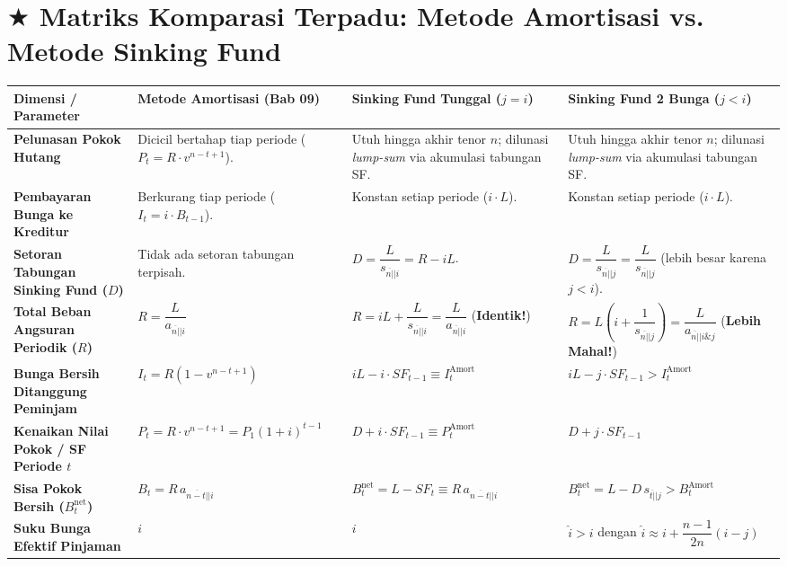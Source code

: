 \documentclass[10pt,a4paper]{article}
\newcommand{\angl}[1]{\overline{#1|}}
\begin{document}
\section*{\large $\bigstar$ Matriks Komparasi Terpadu: Metode Amortisasi vs. Metode Sinking Fund}

\begin{tcolorbox}[
    enhanced,
    colback=white,
    colframe=primaryblue,
    boxrule=0.8pt,
    arc=2mm,
    top=1.5mm, bottom=1.5mm, left=1.5mm, right=1.5mm
]
\footnotesize
\centering
\setlength{\tabcolsep}{2.5pt}
\begin{tabular}{p{2.6cm} p{4.5cm} p{4.7cm} p{4.7cm}}
\toprule
\textbf{Dimensi / Parameter} & \textbf{Metode Amortisasi (Bab 09)} & \textbf{Sinking Fund Tunggal ($j = i$)} & \textbf{Sinking Fund 2 Bunga ($j < i$)} \\
\midrule
\textbf{Pelunasan Pokok Hutang} & Dicicil bertahap tiap periode ($P_t = R \cdot v^{n-t+1}$). & Utuh hingga akhir tenor $n$; dilunasi \textit{lump-sum} via akumulasi tabungan SF. & Utuh hingga akhir tenor $n$; dilunasi \textit{lump-sum} via akumulasi tabungan SF. \\
\addlinespace
\textbf{Pembayaran Bunga ke Kreditur} & Berkurang tiap periode ($I_t = i \cdot B_{t-1}$). & Konstan setiap periode ($i \cdot L$). & Konstan setiap periode ($i \cdot L$). \\
\addlinespace
\textbf{Setoran Tabungan Sinking Fund ($D$)} & Tidak ada setoran tabungan terpisah. & $D = \dfrac{L}{s_{\angl{n}|i}} = R - i L$. & $D = \dfrac{L}{s_{\angl{n}|j}} = \dfrac{L}{s_{\angl{n}|j}}$ (lebih besar karena $j < i$). \\
\addlinespace
\textbf{Total Beban Angsuran Periodik ($R$)} & $R = \dfrac{L}{a_{\angl{n}|i}}$ & $R = i L + \dfrac{L}{s_{\angl{n}|i}} = \dfrac{L}{a_{\angl{n}|i}}$ (\textbf{Identik!}) & $R = L\left(i + \dfrac{1}{s_{\angl{n}|j}}\right) = \dfrac{L}{a_{\angl{n}|i \& j}}$ (\textbf{Lebih Mahal!}) \\
\addlinespace
\textbf{Bunga Bersih Ditanggung Peminjam} & $I_t = R(1 - v^{n-t+1})$ & $i L - i \cdot SF_{t-1} \equiv I_t^{\text{Amort}}$ & $i L - j \cdot SF_{t-1} > I_t^{\text{Amort}}$ \\
\addlinespace
\textbf{Kenaikan Nilai Pokok / SF Periode $t$} & $P_t = R \cdot v^{n-t+1} = P_1(1+i)^{t-1}$ & $D + i \cdot SF_{t-1} \equiv P_t^{\text{Amort}}$ & $D + j \cdot SF_{t-1}$ \\
\addlinespace
\textbf{Sisa Pokok Bersih ($B_t^{\text{net}}$)} & $B_t = R \, a_{\angl{n-t}|i}$ & $B_t^{\text{net}} = L - SF_t \equiv R \, a_{\angl{n-t}|i}$ & $B_t^{\text{net}} = L - D \, s_{\angl{t}|j} > B_t^{\text{Amort}}$ \\
\addlinespace
\textbf{Suku Bunga Efektif Pinjaman} & $i$ & $i$ & $\hat{i} > i$ dengan $\hat{i} \approx i + \dfrac{n-1}{2n}(i - j)$ \\
\bottomrule
\end{tabular}
\end{tcolorbox}
\end{document}
